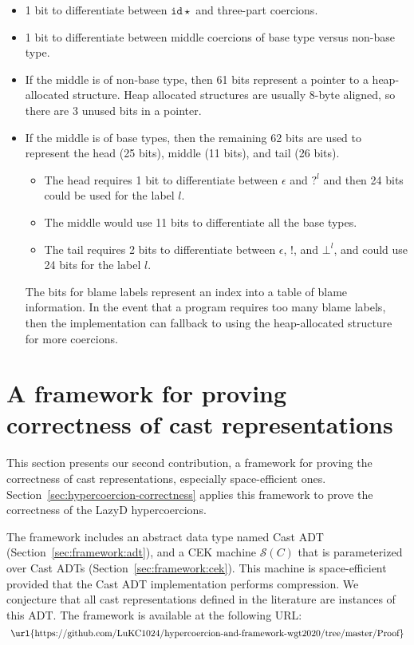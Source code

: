 \documentclass[acmsmall,review]{acmart}\settopmatter{printfolios=true,printccs=false,printacmref=false}
\newcommand{\lazyD}{Lazy\;D}
\newcommand{\hyperCoercionI}[0]{\mathtt{id\star}}
\newcommand{\effCEK}[1]{\ensuremath{\mathcal{S}(#1)}}
\newcommand{\urlLazyDProof}{
	\url{https://github.com/LuKC1024/hypercoercion-and-framework-wgt2020/tree/master/Proof}
}
\begin{document}
\begin{itemize}
\item 1 bit to differentiate between $\hyperCoercionI$
  and three-part coercions.

\item 1 bit to differentiate between middle coercions of base type
  versus non-base type.

\item If the middle is of non-base type, then 61 bits represent a
  pointer to a heap-allocated structure. Heap allocated structures are
  usually 8-byte aligned, so there are 3 unused bits in a pointer.

\item If the middle is of base types, then the remaining 62 bits are
  used to represent the head (25 bits), middle (11 bits), and tail (26
  bits).
  \begin{itemize}
  \item The head requires 1 bit to differentiate between $\epsilon$
    and $?^l$ and then 24 bits could be used for the label $l$.
  \item The middle would use 11 bits to differentiate all the base types.
  \item The tail requires 2 bits to differentiate between $\epsilon$,
    $!$, and $\bot^l$, and could use 24 bits for the label $l$.
  \end{itemize}
  The bits for blame labels represent an index into a table of blame information.
  In the event that a program requires too many blame labels, then the implementation
  can fallback to using the heap-allocated structure for more
  coercions.
\end{itemize}
  

\section{A framework for proving correctness of cast representations}
\label{sec:framework}

This section presents our second contribution, a framework for proving
the correctness of cast representations, especially space-efficient
ones. Section~\ref{sec:hypercoercion-correctness} applies this
framework to prove the correctness of the \lazyD{} hypercoercions.

The framework includes an abstract data type named Cast ADT 
(Section~\ref{sec:framework:adt}), and a CEK machine \effCEK{C} that is 
parameterized over Cast ADTs (Section~\ref{sec:framework:cek}). This machine is 
space-efficient provided that the Cast ADT implementation performs compression. 
We conjecture that all cast representations defined in the literature
are instances of this ADT. The framework is available at the following URL:
\[\text{\urlLazyDProof}\]
\end{document}
